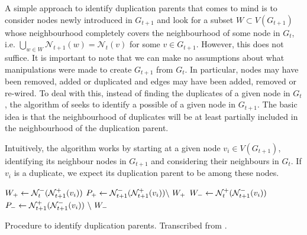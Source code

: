 \documentclass[
	fontsize=10pt, %
	twoside=false, %
	secnumdepth=1, %
  toc=indentunnumbered %
]{kaobook}
\begin{document}
A simple approach to identify duplication parents that comes to mind is to
consider nodes newly introduced in $G_{t+1}$ and look for a subset $W \subset
V(G_{t+1})$ whose neighbourhood completely covers the neighbourhood of some node
in $G_{t}$, i.e. $\bigcup_{w \in W} \mathcal{N}_{t+1}(w) = \mathcal{N}_t(v)$ for
some $v \in G_{t+1}$. However, this does not suffice. It is important to note
that we can make no assumptions about what manipulations were made to create
$G_{t+1}$ from $G_t$. In particular, nodes may have been removed, added or
duplicated and edges may have been added, removed or re-wired.
%
To deal with this, instead of finding the duplicates of a given node in
$G_{t}$, the algorithm of \nielsen{} seeks to identify a possible  of
a given node in $G_{t+1}$. The basic idea is that the neighbourhood of
duplicates will be at least partially included in the neighbourhood of the
duplication parent.

Intuitively, the algorithm works by starting at a given node $v_i \in
V(G_{t+1})$, identifying its neighbour nodes in $G_{t+1}$ and considering their
neighbours in $G_t$. If $v_i$ is a duplicate, we expect its duplication parent
to be among these nodes.

\begin{algorithm}[h]
  \DontPrintSemicolon
     $W_+ \gets \mathcal{N}_t^- ( \mathcal{N}_{t+1}^+(v_i) )$ \; $P_+ \gets
  \mathcal{N}_{t+1}^- ( \mathcal{N}_{t+1}^+(v_i) ) \backslash~ W_+$ \; $W_- \gets
  \mathcal{N}_t^+ ( \mathcal{N}_{t+1}^-(v_i) ) $ \; $P_- \gets \mathcal{N}_{t+1}^+ (
  \mathcal{N}_{t+1}^-(v_i) ) ~\backslash~ W_- $\;
    \label{alg:identify-duplicates}
    \caption{ Procedure to identify duplication parents. Transcribed from
      \citeauthor{nielsen_MachineLearningSupport_2019} \cite{nielsen_MachineLearningSupport_2019}.
    }
\end{algorithm}
\end{document}
